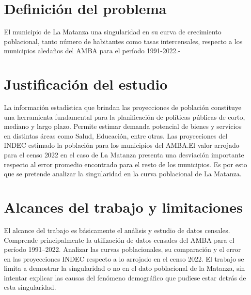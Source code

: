 \documentclass{article}
\theoremstyle{mytheoremstyle}
\theoremstyle{mytheoremstyle}
\theoremstyle{myproblemstyle}
\begin{document}
\section{Definición del problema }
El municipio de La Matanza una singularidad en su curva de crecimiento poblacional, tanto número de habitantes como tasas intercensales, respecto a los 
municipios aledaños del AMBA para el período 1991-2022.-  
\section{Justificación del estudio}
La información estadística que brindan las proyecciones de población constituye una herramienta fundamental
 para la planificación de políticas públicas de corto, mediano y largo plazo. 
 Permite estimar demanda potencial de bienes y servicios en distintas áreas como Salud, Educación, entre otras.\newline
Las proyecciones del INDEC estimado la población para los municipios del AMBA.El valor
 arrojado para el censo 2022 en el caso de La Matanza presenta una desviación importante respecto 
 al error promedio encontrado para el resto de los municipios. Es por esto que se pretende analizar la 
 singularidad en la curva poblacional de La Matanza.

\section{ Alcances del trabajo y limitaciones}
El alcance del trabajo es básicamente el análisis y estudio de datos censales. Comprende principalmente la utilización de 
datos censales del AMBA para el período 1991--2022. Analizar las curvas poblacionales, 
su comparación y el error en las proyecciones INDEC respecto a lo arrojado en el censo 2022.
 El trabajo se limita a demostrar la singularidad o no en el dato poblacional de la Matanza,
  sin intentar explicar las causas del fenómeno demográfico que pudiese estar detrás de esta singularidad.
\end{document}
